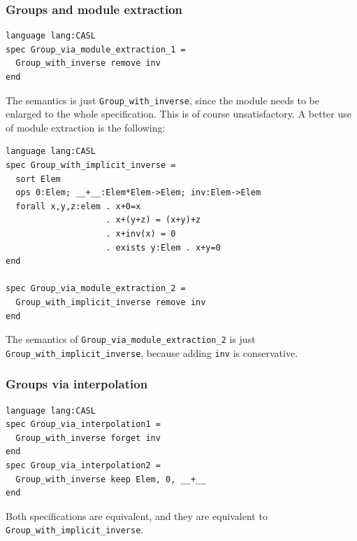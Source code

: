 \documentclass[10pt,fleqn,final]{scrreprt}
\newcommand*{\syntax}[1]{\texttt{#1}}
\newcommand{\sssclause}[1]{\subsubsection{#1}}
\begin{document}
\sssclause{Groups and module extraction}

\begin{lstlisting}[basicstyle=\ttfamily,language=dolText,morekeywords={props,ObjectProperty,Class,DisjointUnionOf,SubClassOf,Characteristics,Transitive,Asymmetric,SubPropertyOf,DisjointClasses,EquivalentTo,inverse,only,forall,iff,if,or,exists,sort,ops,spec,forget},escapechar=@,mathescape]
language lang:CASL
spec Group_via_module_extraction_1 =
  Group_with_inverse remove inv
end
\end{lstlisting}
The semantics is just \syntax{Group\_with\_inverse},
since the module needs to be enlarged to the whole specification.
This is of course unsatisfactory. A better use of module extraction
is the following:

\begin{lstlisting}[basicstyle=\ttfamily,language=dolText,morekeywords={props,ObjectProperty,Class,DisjointUnionOf,SubClassOf,Characteristics,Transitive,Asymmetric,SubPropertyOf,DisjointClasses,EquivalentTo,inverse,only,forall,iff,if,or,exists,sort,ops,spec,forget},escapechar=@,mathescape]
language lang:CASL
spec Group_with_implicit_inverse =
  sort Elem
  ops 0:Elem; __+__:Elem*Elem->Elem; inv:Elem->Elem
  forall x,y,z:elem . x+0=x
                    . x+(y+z) = (x+y)+z
                    . x+inv(x) = 0
                    . exists y:Elem . x+y=0
end

spec Group_via_module_extraction_2 =
  Group_with_implicit_inverse remove inv
end
\end{lstlisting}
The semantics of \syntax{Group\_via\_module\_extraction\_2} is just
\syntax{Group\_with\_implicit\_inverse}, because adding \texttt{inv}
is conservative.
\medskip

\sssclause{Groups via interpolation}

\begin{lstlisting}[basicstyle=\ttfamily,language=dolText,morekeywords={props,ObjectProperty,Class,DisjointUnionOf,SubClassOf,Characteristics,Transitive,Asymmetric,SubPropertyOf,DisjointClasses,EquivalentTo,inverse,only,forall,iff,if,or,exists,sort,ops,spec,forget},escapechar=@,mathescape]
language lang:CASL
spec Group_via_interpolation1 =
  Group_with_inverse forget inv
end
spec Group_via_interpolation2 =
  Group_with_inverse keep Elem, 0, __+__
end
\end{lstlisting}
Both specifications are equivalent, and they 
are equivalent to \syntax{Group\_with\_implicit\_inverse}.
\medskip
\end{document}
